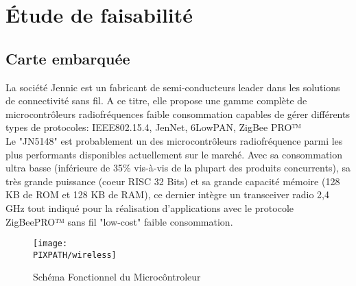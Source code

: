 \section{Étude de faisabilité}

\subsection{Carte embarquée}

La société Jennic est un fabricant  de semi-conducteurs leader dans les solutions de connectivit\'e sans fil. A ce titre, elle propose une gamme compl\`ete de microcontrôleurs radiofr\'equences faible consommation capables de g\'erer diff\'erents types de protocoles: IEEE802.15.4, JenNet, 6LowPAN, ZigBee PRO™\\

Le "JN5148" est probablement un des microcontr\^oleurs radiofr\'equence parmi les plus performants disponibles actuellement sur le march\'e. Avec sa consommation ultra basse (inf\'erieure de 35\% vis-\`a-vis de la plupart des produits concurrents), sa tr\`es grande puissance (coeur RISC 32 Bits) et sa grande capacit\'e m\'emoire (128 KB de ROM et 128 KB de RAM), ce dernier int\`egre un transceiver radio 2,4 GHz tout indiqu\'e pour la r\'ealisation d'applications avec le protocole ZigBeePRO™ sans fil "low-cost" faible consommation.   \\

\begin{figure}[h]
\centering
\texttt{[image: \\PIXPATH/wireless]}
\caption{\label{Solution Wireless Microcontroller}Sch\'ema Fonctionnel du Microc\^ontroleur}
\end{figure}

